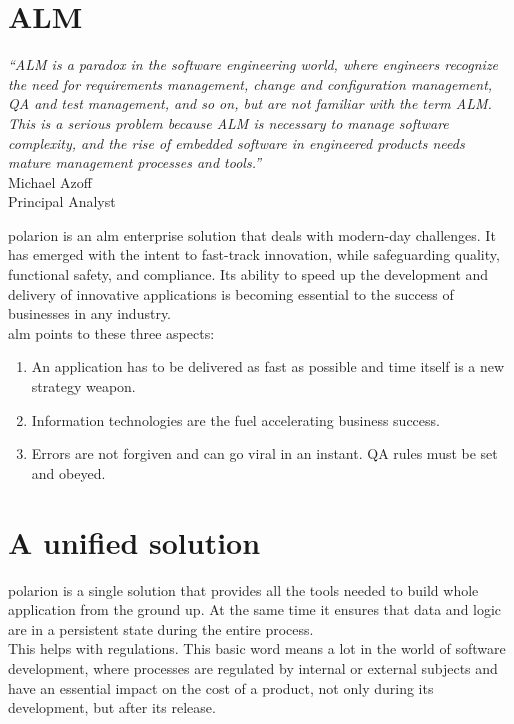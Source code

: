 \documentclass[thesis=M,english]{FITthesis}[2012/06/26]
\begin{document}
\section{ALM}

\begin{center}
	\textit{“ALM is a paradox in the software engineering
		world, where engineers recognize
		the need for requirements management,
		change and configuration management, QA
		and test management, and so on, but are
		not familiar with the term ALM. This is a
		serious problem because ALM is necessary
		to manage software complexity, and the rise
		of embedded software in engineered products
		needs mature management processes
		and tools.”}\\
	Michael Azoff\\
	Principal Analyst\\
\end{center}

\acrshort{polarion} is an \acrshort{alm} enterprise solution that deals with modern-day challenges. It has emerged with the intent to fast-track
innovation, while safeguarding quality, functional safety, and compliance. Its ability to speed up the development and delivery of innovative applications is becoming essential to the success of businesses in any industry.\\

\pagebreak
\acrshort{alm} points to these three aspects:
\begin{enumerate}[nosep]
	\item An application has to be delivered as fast as possible and time itself is a new strategy weapon. 
	\item Information technologies are the fuel accelerating business success.
	\item Errors are not forgiven and can go viral in an instant. QA rules must be set and obeyed.
\end{enumerate}

\section{A unified solution}

\acrshort{polarion} is a single solution that provides all the tools needed to build whole application from the ground up. At the same time it ensures that data and logic are in a persistent state during the entire process.\\ 

This helps with regulations. This basic word means a lot in the world of software development, where processes are regulated by internal or external subjects and have an essential impact on the cost of a product, not only during its development, but after its release.\\
\end{document}
